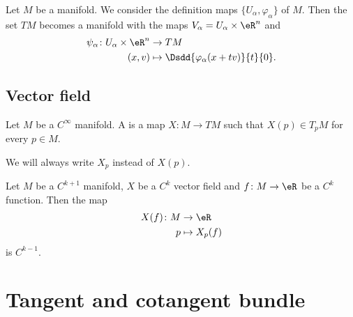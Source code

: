 \begin{theorem}     \label{THOooTSQXooLvJMQb}
    Let \( M\) be a manifold. We consider the definition maps \( \{ U_{\alpha}, \varphi_{\alpha} \}\) of \( M\). Then the set \( TM\) becomes a manifold with the maps \( V_{\alpha}=U_{\alpha}\times \eR^n\) and
    \begin{equation}
        \begin{aligned}
            \psi_{\alpha}\colon U_{\alpha}\times \eR^n&\to TM \\
            (x,v)&\mapsto \Dsdd{ \varphi_{\alpha}(x+tv) }{t}{0}. 
        \end{aligned}
    \end{equation}
\end{theorem}


\subsection{Vector field}

\begin{definition}        \label{DEFooAATTooLhNqDb}
    Let \( M\) be a \(  C^{\infty}\) manifold. A  is a map \( X\colon M\to TM\) such that \( X(p)\in T_pM\) for every \( p\in M\).

    We will always write \( X_p\) instead of \( X(p)\).
\end{definition}

\begin{proposition}         \label{PROPooGYWRooPIyocN}
    Let \( M\) be a \( C^{k+1}\) manifold, \( X\) be a \( C^k\) vector field and \( f\colon M \to \eR\) be a \( C^k\) function. Then the map
    \begin{equation}
        \begin{aligned}
            X(f)\colon M&\to \eR \\
            p&\mapsto X_p(f) 
        \end{aligned}
    \end{equation}
    is \( C^{k-1}\).
\end{proposition}


\section{Tangent and cotangent bundle}

